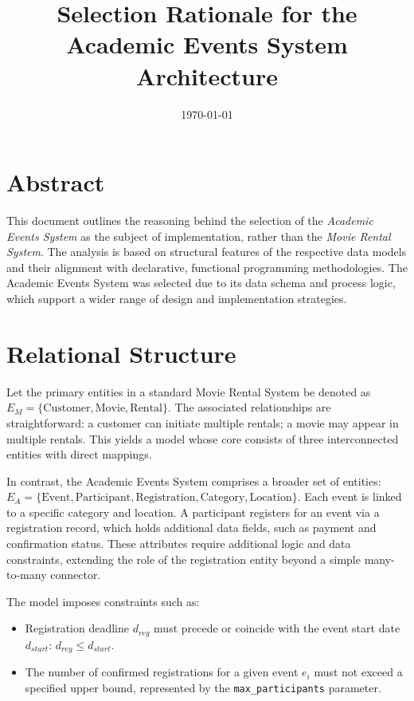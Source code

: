 \documentclass[12pt, a4paper]{article}
\title{\textbf{Selection Rationale for the Academic Events System Architecture}}
\date{\today}
\begin{document}
\maketitle

\section*{Abstract}
This document outlines the reasoning behind the selection of the \textit{Academic Events System} as the subject of implementation, rather than the \textit{Movie Rental System}. The analysis is based on structural features of the respective data models and their alignment with declarative, functional programming methodologies. The Academic Events System was selected due to its data schema and process logic, which support a wider range of design and implementation strategies.

\section{Relational Structure}
Let the primary entities in a standard Movie Rental System be denoted as $E_M = \{ \text{Customer}, \text{Movie}, \text{Rental} \}$. The associated relationships are straightforward: a customer can initiate multiple rentals; a movie may appear in multiple rentals. This yields a model whose core consists of three interconnected entities with direct mappings.

In contrast, the Academic Events System comprises a broader set of entities: $E_A = \{ \text{Event}, \text{Participant}, \text{Registration}, \text{Category}, \text{Location} \}$. Each event is linked to a specific category and location. A participant registers for an event via a registration record, which holds additional data fields, such as payment and confirmation status. These attributes require additional logic and data constraints, extending the role of the registration entity beyond a simple many-to-many connector.

The model imposes constraints such as:
\begin{itemize}
    \item Registration deadline $d_{reg}$ must precede or coincide with the event start date $d_{start}$: $d_{reg} \leq d_{start}$.
    \item The number of confirmed registrations for a given event $e_i$ must not exceed a specified upper bound, represented by the \texttt{max\_participants} parameter.
\end{itemize}
\end{document}
